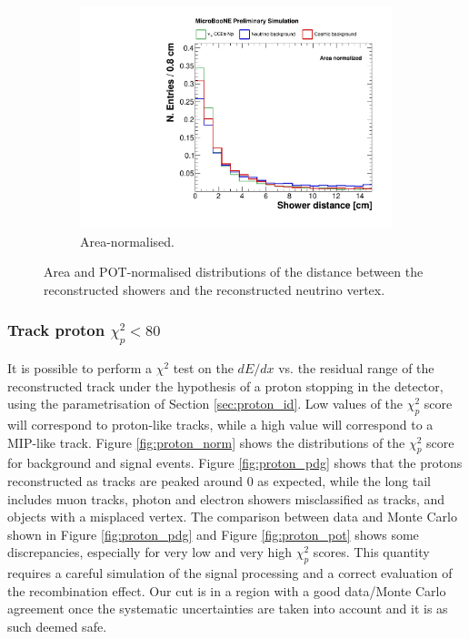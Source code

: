 \begin{figure}[htbp]
\begin{subfigure}{0.49\textwidth}
    \includegraphics[width=\linewidth]{figures/h_shower_distance_norm.pdf}
    \caption{Area-normalised.} \label{fig:showerd_norm}
  \end{subfigure}
  \caption{Area and POT-normalised distributions of the distance between the reconstructed showers and the reconstructed neutrino vertex.}
\end{figure}

\subsubsection*{Track proton $\chi_{p}^2 < 80$}
It is possible to perform a $\chi^2$ test on the $dE/dx$ vs. the residual range of the reconstructed track under the hypothesis of a proton stopping in the detector, using the parametrisation of Section \ref{sec:proton_id}. Low values of the $\chi_{p}^2$ score will correspond to proton-like tracks, while a high value will correspond to a MIP-like track. Figure \ref{fig:proton_norm} shows the distributions of the $\chi_{p}^2$ score for background and signal events. Figure \ref{fig:proton_pdg} shows that the protons reconstructed as tracks are peaked around 0 as expected, while the long tail includes muon tracks, photon and electron showers misclassified as tracks, and objects with a misplaced vertex. The comparison between data and Monte Carlo shown in Figure \ref{fig:proton_pdg} and Figure \ref{fig:proton_pot} shows some discrepancies, especially for very low and very high $\chi_{p}^2$ scores. This quantity requires a careful simulation of the signal processing and a correct evaluation of the recombination effect. Our cut is in a region with a good data/Monte Carlo agreement once the systematic uncertainties are taken into account and it is as such deemed safe.

